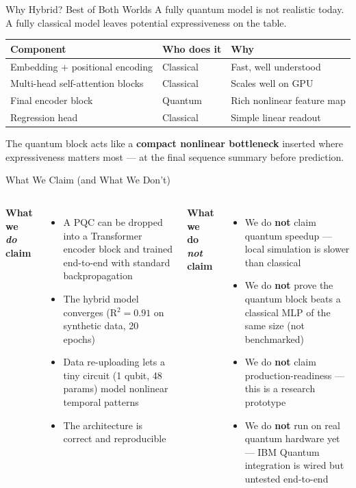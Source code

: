 \documentclass[aspectratio=169,professionalfonts]{beamer}
\begin{document}
\begin{frame}{Why Hybrid? Best of Both Worlds}
\Large
A fully quantum model is not realistic today. A fully classical model leaves potential expressiveness on the table.

\vspace{0.7em}
\normalsize
\begin{center}
\begin{tabular}{lll}
\toprule
Component & Who does it & Why \\
\midrule
Embedding + positional encoding & Classical & Fast, well understood \\
Multi-head self-attention blocks  & Classical & Scales well on GPU \\
Final encoder block               & Quantum   & Rich nonlinear feature map \\
Regression head                   & Classical & Simple linear readout \\
\bottomrule
\end{tabular}
\end{center}

\vspace{0.6em}
The quantum block acts like a \textbf{compact nonlinear bottleneck} inserted where expressiveness matters most --- at the final sequence summary before prediction.
\end{frame}

\begin{frame}{What We Claim (and What We Don't)}
\begin{columns}[T]
\textbf{\color{Accent}What we \emph{do} claim}
\begin{itemize}
  \item A PQC can be dropped into a Transformer encoder block and trained end-to-end with standard backpropagation
  \item The hybrid model converges (\mbox{R$^2 = 0.91$} on synthetic data, 20 epochs)
  \item Data re-uploading lets a tiny circuit (1 qubit, 48 params) model nonlinear temporal patterns
  \item The architecture is correct and reproducible
\end{itemize}

\textbf{\color{Alert}What we do \emph{not} claim}
\begin{itemize}
  \item We do \textbf{not} claim quantum speedup --- local simulation is slower than classical
  \item We do \textbf{not} prove the quantum block beats a classical MLP of the same size (not benchmarked)
  \item We do \textbf{not} claim production-readiness --- this is a research prototype
  \item We do \textbf{not} run on real quantum hardware yet --- IBM Quantum integration is wired but untested end-to-end
\end{itemize}
\end{columns}
\end{frame}
\end{document}

